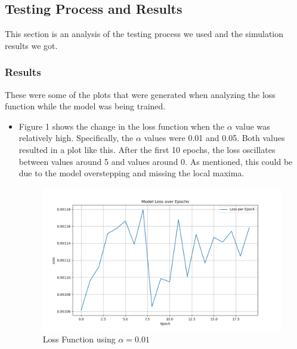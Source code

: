 \documentclass[11pt]{article}
\begin{document}
\begin{enumerate}
\subsection{Testing Process and Results}
This section is an analysis of the testing process we used and the simulation results we got. 
\subsubsection{Results}
These were some of the plots that were generated when analyzing the loss function while the model was being trained. 
\begin{itemize}
\item Figure 1 shows the change in the loss function when the $\alpha$ value was relatively high. Specifically, the $\alpha$ values were 0.01 and 0.05. Both values resulted in a plot like this. After the first 10 epochs, the loss oscillates between values around 5 and values around 0. As mentioned, this could be due to the model overstepping and missing the local maxima.  
        \begin{figure}[H]
        \centering
        \includegraphics[width=0.8\linewidth]{loss_m2highalpha.png}
        \caption{Loss Function using $\alpha = 0.01$}
        \end{figure}
       

\end{itemize}
\end{enumerate}
\end{document}
